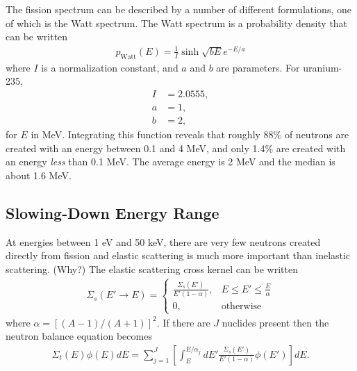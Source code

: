 \documentclass[11pt]{article}
\begin{document}
The fission spectrum can be described by a number of different formulations, one of which is the Watt spectrum.  The Watt spectrum is a probability density that can be written
\begin{align}
  p_\text{Watt}(E) = \frac{1}{I} \sinh\sqrt{bE} e^{-E/a}
\end{align}
where \(I\) is a normalization constant, and \(a\) and \(b\) are parameters.  For uranium-235,
\begin{align}
  I &= 2.0555, \\
  a &= 1, \\
  b &= 2,
\end{align}
for \(E\) in MeV.  Integrating this function reveals that roughly 88\% of neutrons are created with an energy between 0.1 and 4 MeV, and only 1.4\% are created with an energy \emph{less} than 0.1 MeV.  The average energy is 2 MeV and the median is about 1.6 MeV.

\subsection{Slowing-Down Energy Range}
\label{sec:orgheadline3}
At energies between 1 eV and 50 keV, there are very few neutrons created directly from fission and elastic scattering is much more important than inelastic scattering.  (Why?)  The elastic scattering cross kernel can be written
\begin{align}
  \Sigma_s(E' \rightarrow E) = 
  \begin{cases}
    \frac{\Sigma_s(E')}{E'(1-\alpha)}, & E \leq E' \leq \frac{E}{\alpha} \\
    0, & \text{otherwise}
  \end{cases}
\end{align}
where \(\alpha = \left[(A-1)/(A+1)\right]^2\).  If there are \(J\) nuclides present then the neutron balance equation becomes
\begin{align}
  \Sigma_t(E) \phi(E) dE
  = \sum_{j=1}^J \left[ \int_E^{E/\alpha_j} dE' \frac{\Sigma_s(E')}{E'(1-\alpha)} \phi(E') \right] dE.
\end{align}
\end{document}
